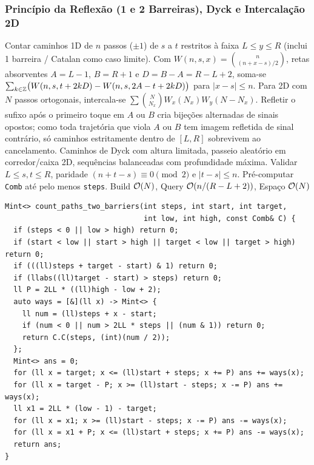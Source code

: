 \subsubsection{Princípio da Reflexão (1 e 2 Barreiras), Dyck e Intercalação 2D}
\algobox
  {Contar caminhos 1D de $n$ passos ($\pm 1$) de $s$ a $t$ restritos à faixa $L \le y \le R$ (inclui 1 barreira / Catalan como caso limite).}
  {Com $W(n, s, x) = \binom{n}{(n + x - s)/2}$, retas absorventes $A = L - 1$, $B = R + 1$ e $D = B - A = R - L + 2$, soma-se $\sum_{k \in \mathbb{Z}} \bigl(W(n, s, t + 2kD) - W(n, s, 2A - t + 2kD)\bigr)$ para $|x - s| \le n$. Para 2D com $N$ passos ortogonais, intercala-se $\sum \binom{N}{N_x} W_x(N_x) W_y(N - N_x)$.}
  {Refletir o sufixo após o primeiro toque em $A$ ou $B$ cria bijeções alternadas de sinais opostos; como toda trajetória que viola $A$ ou $B$ tem imagem refletida de sinal contrário, só caminhos estritamente dentro de $[L, R]$ sobrevivem ao cancelamento.}
  {Caminhos de Dyck com altura limitada, passeio aleatório em corredor/caixa 2D, sequências balanceadas com profundidade máxima.}
  {Validar $L \le s, t \le R$, paridade $(n + t - s) \equiv 0 \pmod 2$ e $|t - s| \le n$. Pré-computar \texttt{Comb} até pelo menos \texttt{steps}.}
  {Build $\mathcal{O}(N)$, Query $\mathcal{O}(n / (R - L + 2))$, Espaço $\mathcal{O}(N)$}

\begin{lstlisting}
Mint<> count_paths_two_barriers(int steps, int start, int target,
                                int low, int high, const Comb& C) {
  if (steps < 0 || low > high) return 0;
  if (start < low || start > high || target < low || target > high) return 0;
  if (((ll)steps + target - start) & 1) return 0;
  if (llabs((ll)target - start) > steps) return 0;
  ll P = 2LL * ((ll)high - low + 2);
  auto ways = [&](ll x) -> Mint<> {
    ll num = (ll)steps + x - start;
    if (num < 0 || num > 2LL * steps || (num & 1)) return 0;
    return C.C(steps, (int)(num / 2));
  };
  Mint<> ans = 0;
  for (ll x = target; x <= (ll)start + steps; x += P) ans += ways(x);
  for (ll x = target - P; x >= (ll)start - steps; x -= P) ans += ways(x);
  ll x1 = 2LL * (low - 1) - target;
  for (ll x = x1; x >= (ll)start - steps; x -= P) ans -= ways(x);
  for (ll x = x1 + P; x <= (ll)start + steps; x += P) ans -= ways(x);
  return ans;
}
\end{lstlisting}

